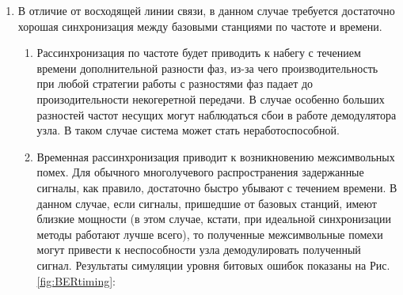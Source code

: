 \documentclass[a4paper,12pt,oneside]{scrartcl}
\begin{document}
\begin{enumerate}
Результат иллюстрирует Рис.\ref{fig:ErrorProbPlane}. Видно, что по мере увеличения числа пакетов эффект падает, поэтому передача большого количества тренировочных пакетов может быть нерациональной.

\begin{figure}[!htb]
\caption{Зависимость вероятности ошибки в бите от отношения сигнал-шум при разных k}
\label{fig:ErrorProbPlane}
\end{figure}
\FloatBarrier
При этом увеличение траффика вычисляется по простой формуле:
\begin{equation}
\frac{\Delta Tr}{Tr} = \frac{k}{L} * 100\%
\label{eq:Traffic}
\end{equation}

\item В отличие от восходящей линии связи, в данном случае требуется достаточно хорошая синхронизация между базовыми станциями по частоте и времени. 
\begin{enumerate}
\item Рассинхронизация по частоте будет приводить к набегу с течением времени дополнительной разности фаз, из-за чего производительность при любой стратегии работы с разностями фаз падает до произодительности некогеретной передачи.
В случае особенно больших разностей частот несущих могут наблюдаться сбои в работе демодулятора узла.
В таком случае система может стать неработоспособной.

\item Временная рассинхронизация приводит к возникновению межсимвольных помех. 
Для обычного многолучевого распространения задержанные сигналы, как правило, достаточно быстро убывают с течением времени. 
В данном случае, если сигналы, пришедшие от базовых станций, имеют близкие мощности (в этом случае, кстати, при идеальной синхронизации методы работают лучше всего), то полученные межсимвольные помехи могут привести к неспособности узла демодулировать полученный сигнал.
Результаты симуляции уровня битовых ошибок показаны на Рис.\ref{fig:BERtiming}:


\end{enumerate}
\end{enumerate}
\end{document}
